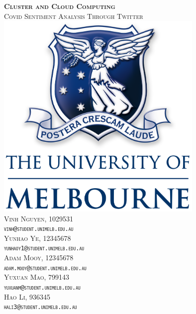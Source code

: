\begin{titlepage}


\center %
 
\vfill
\textsc{\large\textbf{Cluster and Cloud Computing} \\[1cm]\LARGE{Covid Sentiment Analysis Through Twitter }}
\vfill
\includegraphics[width=10cm]{images/unimelblogo.png}
\vfill
\vspace{5mm}\\
\textsc{ Vinh Nguyen, 1029531\\
    \texttt{vinh@student.unimelb.edu.au} }\\
    \vspace{5mm}
\textsc{ Yunhao Ye, 12345678\\
    \texttt{yunhaoy1@student.unimelb.edu.au}}\\
        \vspace{5mm}
\textsc{ Adam Mooy, 12345678\\
    \texttt{adam.mooy@student.unimelb.edu.au}}\\
    \vspace{5mm}
\textsc{ Yuxuan Mao, 799143\\
    \texttt{yuxuanm@student.unimelb.edu.au}}\\
    \vspace{5mm}
\textsc{ Hao Li, 936345\\
    \texttt{hali3@student.unimelb.edu.au}}
\end{titlepage}
